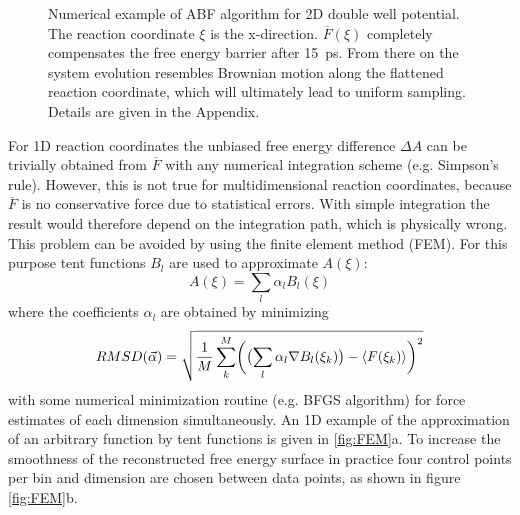 \begin{figure}[H]
    \centering
    \vspace{-1cm}
    \caption{Numerical example of ABF algorithm for 2D double well potential. The reaction coordinate $\xi$ is the x-direction. $\overline{F}(\xi)$ completely compensates the free energy barrier after 15~ps. From there on the system evolution resembles Brownian motion along the flattened reaction coordinate, which will ultimately lead to uniform sampling. Details are given in the Appendix.}
\label{fig:ABF}%
\end{figure}

For 1D reaction coordinates the unbiased free energy difference $\Delta A$ can be trivially obtained from $\overline{F}$ with any numerical integration scheme (e.g. Simpson's rule).
However, this is not true for multidimensional reaction coordinates, because $\overline{F}$ is no conservative force due to statistical errors. With simple integration the result would therefore depend on the integration path, which is physically wrong. This problem can be avoided by using the finite element method (FEM). For this purpose tent functions $B_l$ are used to approximate $A(\xi)$:\autocite{darve2008adaptive}
\begin{equation}
  A(\xi) = \sum_l \alpha_l B_l(\xi)
\end{equation}
where the coefficients $\alpha_l$ are obtained by minimizing
\begin{equation}
  RMSD(\vec{\alpha})=\sqrt{\frac{1}{M}\sum_k^M\biggl(\bigl(\sum_l \alpha_l \nabla B_l(\xi_k)\bigr) - \braket{F(\xi_k)} \biggr)^2}
\end{equation}
with some numerical minimization routine (e.g. BFGS algorithm\autocite{nocedal2006numerical}) for force estimates of each dimension simultaneously. An 1D example of the approximation of an arbitrary function by tent functions is given in \ref{fig:FEM}a. To increase the smoothness of the reconstructed free energy surface in practice four control points per bin and dimension are chosen between data points, as shown in figure \ref{fig:FEM}b.

